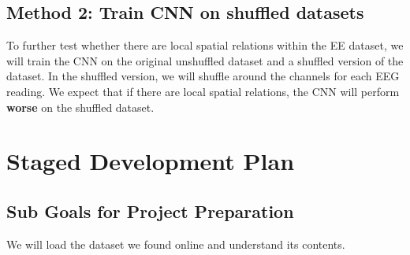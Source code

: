 \documentclass[11pt]{article}
\begin{document}

\vspace{2mm}

\subsection{Method 2: Train CNN on shuffled datasets}

\vspace{1mm}

To further test whether there are local spatial relations within the EE dataset, 
we will train the CNN on the original unshuffled dataset and a shuffled version of the dataset. In the shuffled version, we will shuffle around the channels for each EEG reading. We expect that if there are local spatial relations, the CNN will perform \textbf{worse} on the shuffled dataset.


    
    

\section{Staged Development Plan}



\subsection{Sub Goals for Project Preparation}
We will load the dataset we found online and understand its contents.
\end{document}

